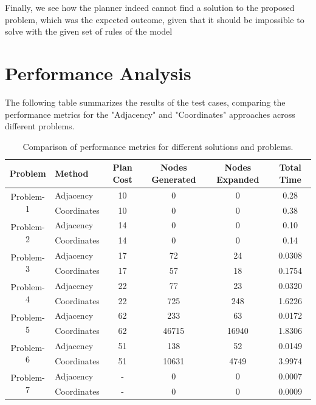 \documentclass{article}
\begin{document}
Finally, we see how the planner indeed cannot find a solution to the proposed problem, which was the expected outcome, given that it should be impossible to solve with the given set of rules of the model

\section{Performance Analysis}

The following table summarizes the results of the test cases, comparing the performance metrics for the "Adjacency" and "Coordinates" approaches across different problems.

\begin{table}[ht]
    \centering
    \small
    \begin{tabular}{|c|l|c|c|c|c|}
        \hline
        \textbf{Problem} & \textbf{Method} & \textbf{Plan Cost} & \textbf{Nodes Generated} & \textbf{Nodes Expanded} & \textbf{Total Time} \\
        \hline
        \multirow{2}{*}{Problem-1} & Adjacency & 10 & 0 & 0 & 0.28 \\
                                   & Coordinates & 10 & 0 & 0 & 0.38 \\
        \hline
        \multirow{2}{*}{Problem-2} & Adjacency & 14 & 0 & 0 & 0.10 \\
                                   & Coordinates & 14 & 0 & 0 & 0.14 \\
        \hline
        \multirow{2}{*}{Problem-3} & Adjacency & 17 & 72 & 24 & 0.0308 \\
                                   & Coordinates & 17 & 57 & 18 & 0.1754 \\
        \hline
        \multirow{2}{*}{Problem-4} & Adjacency & 22 & 77 & 23 & 0.0320 \\
                                   & Coordinates & 22 & 725 & 248 & 1.6226 \\
        \hline
        \multirow{2}{*}{Problem-5} & Adjacency & 62 & 233 & 63 & 0.0172 \\
                                   & Coordinates & 62 & 46715 & 16940 & 1.8306 \\
        \hline
        \multirow{2}{*}{Problem-6} & Adjacency & 51 & 138 & 52 & 0.0149 \\
                                   & Coordinates & 51 & 10631 & 4749 & 3.9974 \\
        \hline
        \multirow{2}{*}{Problem-7} & Adjacency & - & 0 & 0 & 0.0007 \\
                                   & Coordinates & - & 0 & 0 & 0.0009 \\
        \hline
    \end{tabular}
    \caption{Comparison of performance metrics for different solutions and problems.}
    \label{tab:results}
\end{table}
\end{document}
